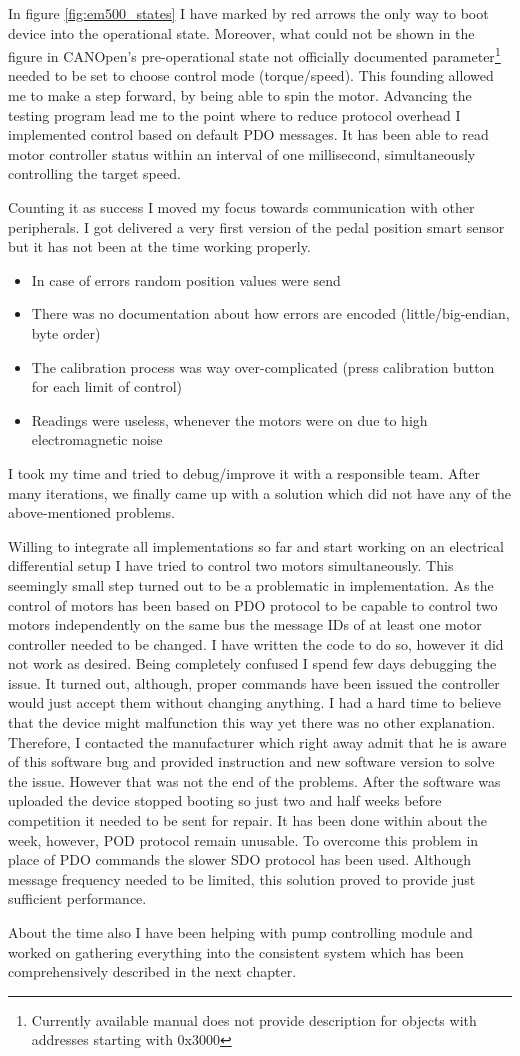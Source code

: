 In figure \ref{fig:em500_states} I have marked by red arrows the only way to boot device into the operational state. Moreover, what could not be shown in the figure in CANOpen's pre-operational state not officially documented parameter\footnote{Currently available manual does not provide description for objects with addresses starting with 0x3000} needed to be set to choose control mode (torque/speed). This founding allowed me to make a step forward, by being able to spin the motor.
Advancing the testing program lead me to the point where to reduce protocol overhead I implemented control based on default PDO messages. It has been able to read motor controller status within an interval of one millisecond, simultaneously controlling the target speed.

Counting it as success I moved my focus towards communication with other peripherals. I got delivered a very first version of the pedal position smart sensor but it has not been at the time working properly.
\begin{itemize}
    \item In case of errors random position values were send
    \item There was no documentation about how errors are encoded (little/big-endian, byte order)
    \item The calibration process was way over-complicated (press calibration button for each limit of control)
    \item Readings were useless, whenever the motors were on due to high electromagnetic noise
\end{itemize} 
I took my time and tried to debug/improve it with a responsible team. After many iterations, we finally came up with a solution which did not have any of the above-mentioned problems.

Willing to integrate all implementations so far and start working on an electrical differential setup I have tried to control two motors simultaneously. This seemingly small step turned out to be a problematic in implementation.
As the control of motors has been based on PDO protocol to be capable to control two motors independently on the same bus the message IDs of at least one motor controller needed to be changed. I have written the code to do so, however it did not work as desired. Being completely confused I spend few days debugging the issue. 
It turned out, although, proper commands have been issued the controller would just accept them without changing anything. I had a hard time to believe that the device might malfunction this way yet there was no other explanation. Therefore, I contacted the manufacturer which right away admit that he is aware of this software bug and provided instruction and new software version to solve the issue. However that was not the end of the problems.
After the software was uploaded the device stopped booting so just two and half weeks before competition it needed to be sent for repair. It has been done within about the week, however, POD protocol remain unusable.
To overcome this problem in place of PDO commands the slower SDO protocol has been used. Although message frequency needed to be limited, this solution proved to provide just sufficient performance.

About the time also I have been helping with pump controlling module and worked on gathering everything into the consistent system which has been comprehensively described in the next chapter.